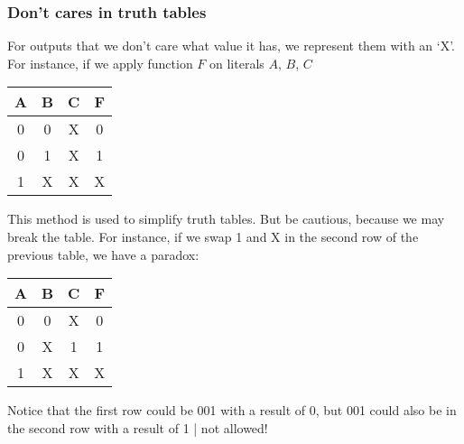 \documentclass{report}
\begin{document}
\subsubsection{Don't cares in truth tables}
For outputs that we don't care what value it has, we represent them with an `X'. For instance, if we apply function $F$ on literals $A$, $B$, $C$
\begin{center}
\begin{tabular}{ c | c | c | c }
\textbf{A} & \textbf{B} & \textbf{C} & \textbf{F}\\ \hline
0 & 0 & X & 0 \\ \hline
0 & 1 & X & 1 \\ \hline
1 & X & X & X \\
\end{tabular}
\end{center}
This method is used to simplify truth tables. But be cautious, because we may break the table. For instance, if we swap 1 and X in the second row of the previous table, we have a paradox:
\begin{center}
\begin{tabular}{ c | c | c | c }
\textbf{A} & \textbf{B} & \textbf{C} & \textbf{F}\\ \hline
0 & 0 & X & 0 \\ \hline
0 & X & 1 & 1 \\ \hline
1 & X & X & X \\
\end{tabular}
\end{center}
Notice that the first row could be 001 with a result of 0, but 001 could also be in the second row with a result of 1 | not allowed!
\end{document}

